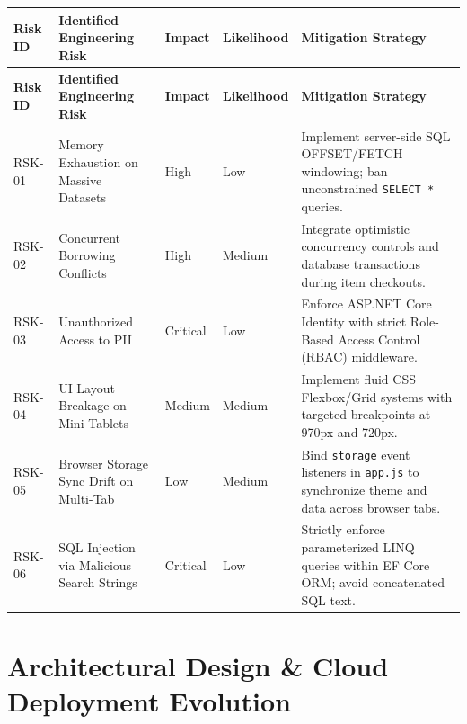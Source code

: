 \documentclass[11pt,a4paper]{report}
\begin{document}
\vspace{10pt}
\noindent
\begin{center}
\renewcommand{\arraystretch}{1.25}
\begin{longtable}{|L{1.8cm}|L{3.8cm}|L{1.8cm}|L{2.0cm}|L{5.6cm}|}
\hline
{}
\textbf{\color{white}Risk ID} & \textbf{\color{white}Identified Engineering Risk} & \textbf{\color{white}Impact} & \textbf{\color{white}Likelihood} & \textbf{\color{white}Mitigation Strategy} \\
\hline
\endfirsthead
\hline
{}
\textbf{\color{white}Risk ID} & \textbf{\color{white}Identified Engineering Risk} & \textbf{\color{white}Impact} & \textbf{\color{white}Likelihood} & \textbf{\color{white}Mitigation Strategy} \\
\hline
\endhead
RSK-01 & Memory Exhaustion on Massive Datasets & High & Low & Implement server-side SQL OFFSET/FETCH windowing; ban unconstrained \texttt{SELECT *} queries. \\
\hline
{}
RSK-02 & Concurrent Borrowing Conflicts & High & Medium & Integrate optimistic concurrency controls and database transactions during item checkouts. \\
\hline
RSK-03 & Unauthorized Access to PII & Critical & Low & Enforce ASP.NET Core Identity with strict Role-Based Access Control (RBAC) middleware. \\
\hline
{}
RSK-04 & UI Layout Breakage on Mini Tablets & Medium & Medium & Implement fluid CSS Flexbox/Grid systems with targeted breakpoints at 970px and 720px. \\
\hline
RSK-05 & Browser Storage Sync Drift on Multi-Tab & Low & Medium & Bind \texttt{storage} event listeners in \texttt{app.js} to synchronize theme and data across browser tabs. \\
\hline
{}
RSK-06 & SQL Injection via Malicious Search Strings & Critical & Low & Strictly enforce parameterized LINQ queries within EF Core ORM; avoid concatenated SQL text. \\
\hline
\end{longtable}
\end{center}

\newpage

\chapter{Architectural Design \& Cloud Deployment Evolution}
\end{document}

